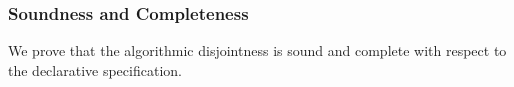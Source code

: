 \begin{comment}
We illustrate \Cref{def:inter:ad} with a few examples:

\begin{enumerate}
  \item $\boldsymbol{A = [[Int]], \ B = \ [[A -> B]]:}$ \\
        $[[findsubtypes Int]]$ returns \{$[[Int]]$\} and $[[findsubtypes A -> B]]$ returns
        \{$[[Top -> Bot]]$\}. Set intersection of \{$[[Int]]$\} and \{$[[Top -> Bot]]$\} is
        empty set \{\}. Therefore, $[[Int]]$ and $[[A -> B]]$ are disjoint types.
  \item $\boldsymbol{A = [[Int]], \ B = \ [[Bot]]:}$ \\
        $[[findsubtypes Int]]$ returns \{$[[Int]]$\} and $[[findsubtypes Bot]]$ returns
        \{\}. Set intersection of \{$[[Int]]$\} and \{\} is
        empty set \{\}. Therefore, $[[Int]]$ and $[[Bot]]$ are disjoint types.
        In general, type $[[Bot]]$ is disjoint to all types because $[[findsubtypes Bot]]$
        will always return \{\} and intersection of \{\} with all other sets is \{\}.
  \item $\boldsymbol{A = [[Int /\ A -> B]], \ B = \ [[Int]]:}$ \\
        $[[findsubtypes Int /\ A -> B]]$ returns \{\} and $[[findsubtypes Int]]$ returns
        \{$[[Int]]$\}. Set intersection of \{\} and \{$[[Int]]$\} is
        empty set \{\}. Therefore, $[[Int /\ A -> B]]$ and $[[Int]]$ are disjoint types.
        In general, intersection type of two disjoint types which is $[[Int /\ A -> B]]$ in this case,
        is always disjoint to all types.
  \item $\boldsymbol{A = [[Int]], \ B = \ [[Top]]:}$ \\
        $[[findsubtypes Int]]$ returns \{$[[Int]]$\} and $[[findsubtypes Top]]$ returns
        \{$[[Int]]$, $[[Top -> Bot]]$\}.
        Set intersection of \{$[[Int]]$\} and \{$[[Int]]$, $[[Top -> Bot]]$\} is
        set \{$[[Int]]$\}. Therefore, $[[Int]]$ and $[[Top]]$ are not disjoint types.
\end{enumerate}
\end{comment}

\subsubsection*{Soundness and Completeness}

We prove that the algorithmic disjointness is sound and complete with respect to
the declarative specification.

